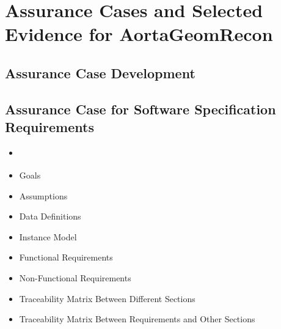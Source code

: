 \chapter{Assurance Cases and Selected Evidence for AortaGeomRecon}

\section{Assurance Case Development}

\section{Assurance Case for Software Specification Requirements}

\begin{itemize}
\item \citep{SRS}
\item Goals
\item Assumptions
\item Data Definitions
\item Instance Model
\item Functional Requirements
\item Non-Functional Requirements
\item Traceability Matrix Between Different Sections
\item Traceability Matrix Between Requirements and Other Sections
\end{itemize}

